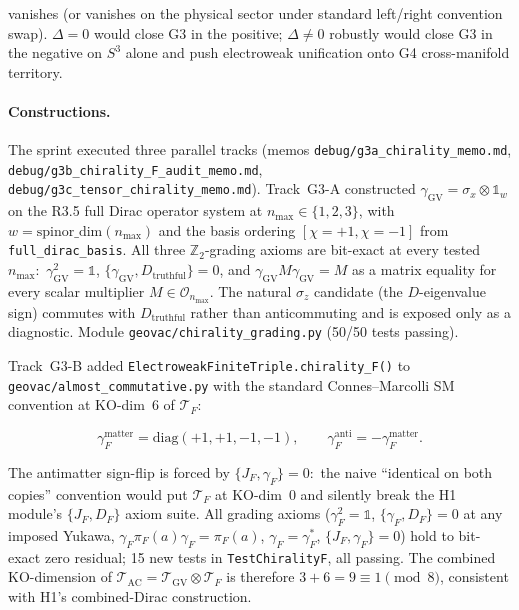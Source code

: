 \documentclass[11pt]{article}
\begin{document}
vanishes (or vanishes on the physical sector under standard
left/right convention swap).  $\Delta = 0$ would close G3 in the
positive; $\Delta \neq 0$ robustly would close G3 in the negative
on $S^3$ alone and push electroweak unification onto G4
cross-manifold territory.

\paragraph{Constructions.}  The sprint executed three parallel
tracks (memos
\texttt{debug/g3a\_chirality\_memo.md},
\texttt{debug/g3b\_chirality\_F\_audit\_memo.md},
\texttt{debug/g3c\_tensor\_chirality\_memo.md}).  Track~G3-A
constructed
$\gamma_{\mathrm{GV}} = \sigma_x \otimes \mathbb{1}_w$ on the
R3.5 full Dirac operator system at $n_{\max} \in \{1, 2, 3\}$, with
$w = \mathrm{spinor\_dim}(n_{\max})$ and the basis ordering
$[\chi = +1, \chi = -1]$ from \texttt{full\_dirac\_basis}.  All three
$\mathbb{Z}_2$-grading axioms are bit-exact at every tested
$n_{\max}$:\ $\gamma_{\mathrm{GV}}^2 = \mathbb{1}$,
$\{\gamma_{\mathrm{GV}}, D_{\mathrm{truthful}}\} = 0$, and
$\gamma_{\mathrm{GV}} M \gamma_{\mathrm{GV}} = M$ as a matrix
equality for every scalar multiplier $M \in \mathcal{O}_{n_{\max}}$.
The natural $\sigma_z$ candidate (the $D$-eigenvalue sign) commutes
with $D_{\mathrm{truthful}}$ rather than anticommuting and is exposed
only as a diagnostic.  Module
\texttt{geovac/chirality\_grading.py} (50/50 tests passing).

Track~G3-B added \texttt{ElectroweakFiniteTriple.chirality\_F()} to
\texttt{geovac/almost\_commutative.py} with the standard
Connes--Marcolli SM convention at KO-dim~6 of $\mathcal{T}_F$:

\begin{equation}
\gamma_F^{\mathrm{matter}} = \mathrm{diag}(+1, +1, -1, -1), \qquad
\gamma_F^{\mathrm{anti}} = -\gamma_F^{\mathrm{matter}}.
\end{equation}

The antimatter sign-flip is forced by $\{J_F, \gamma_F\} = 0$:\ the
naive ``identical on both copies'' convention would put
$\mathcal{T}_F$ at KO-dim~0 and silently break the H1 module's
$\{J_F, D_F\}$ axiom suite.  All grading axioms
($\gamma_F^2 = \mathbb{1}$, $\{\gamma_F, D_F\} = 0$ at any imposed
Yukawa, $\gamma_F \pi_F(a) \gamma_F = \pi_F(a)$,
$\gamma_F = \gamma_F^*$, $\{J_F, \gamma_F\} = 0$) hold to bit-exact
zero residual; 15 new tests in \texttt{TestChiralityF}, all passing.
The combined KO-dimension of
$\mathcal{T}_{\mathrm{AC}} = \mathcal{T}_{\mathrm{GV}} \otimes
\mathcal{T}_F$ is therefore $3 + 6 = 9 \equiv 1 \pmod 8$, consistent
with H1's combined-Dirac construction.
\end{document}
